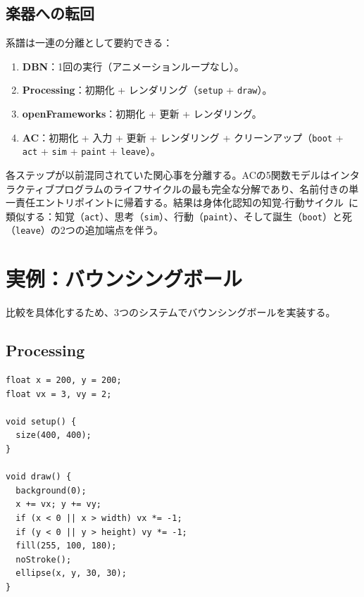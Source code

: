 \documentclass[10pt,letterpaper,twocolumn]{article}
\begin{document}
\subsection{楽器への転回}

系譜は一連の分離として要約できる：

\begin{enumerate}
  \item \textbf{DBN}：1回の実行（アニメーションループなし）。
  \item \textbf{Processing}：初期化 + レンダリング（\texttt{setup} + \texttt{draw}）。
  \item \textbf{openFrameworks}：初期化 + 更新 + レンダリング。
  \item \textbf{AC}：初期化 + 入力 + 更新 + レンダリング + クリーンアップ（\texttt{boot} + \texttt{act} + \texttt{sim} + \texttt{paint} + \texttt{leave}）。
\end{enumerate}

各ステップが以前混同されていた関心事を分離する。ACの5関数モデルはインタラクティブプログラムのライフサイクルの最も完全な分解であり、名前付きの単一責任エントリポイントに帰着する。結果は身体化認知の知覚-行動サイクル~\citep{varela1991embodied}に類似する：知覚（\texttt{act}）、思考（\texttt{sim}）、行動（\texttt{paint}）、そして誕生（\texttt{boot}）と死（\texttt{leave}）の2つの追加端点を伴う。


\section{実例：バウンシングボール}
\label{sec:example}

比較を具体化するため、3つのシステムでバウンシングボールを実装する。

\subsection{Processing}

\begin{lstlisting}[style=processingstyle]
float x = 200, y = 200;
float vx = 3, vy = 2;

void setup() {
  size(400, 400);
}

void draw() {
  background(0);
  x += vx; y += vy;
  if (x < 0 || x > width) vx *= -1;
  if (y < 0 || y > height) vy *= -1;
  fill(255, 100, 180);
  noStroke();
  ellipse(x, y, 30, 30);
}
\end{lstlisting}
\end{document}
